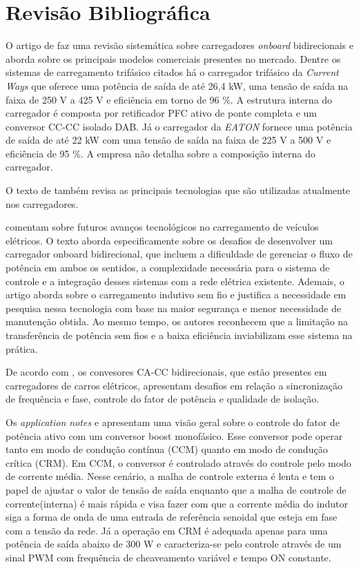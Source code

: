 \chapter{Revisão Bibliográfica}

O artigo de \cite{Yuan:2021} faz uma revisão sistemática sobre carregadores \textit{onboard}
bidirecionais e aborda sobre os principais modelos comerciais presentes no mercado. Dentre os
sistemas de carregamento trifásico citados há o carregador trifásico da \textit{Current Ways}
que oferece uma potência de saída de até 26,4 kW, uma tensão de saída na faixa de 250 V a 425 V
e eficiência em torno de 96 \%. A estrutura interna do carregador é composta por retificador
PFC ativo de ponte completa e um conversor CC-CC isolado DAB. Já o carregador da \textit{EATON}
fornece uma potência de saída de até 22 kW com uma tensão de saída na faixa de 225 V a 500 V e
eficiência de 95 \%. A empresa não detalha sobre a composição interna do carregador.

O texto de \cite{Yuan:2021} também revisa as principais tecnologias que são utilizadas
atualmente nos carregadores.

\cite{Baharom:2024} comentam sobre futuros avanços tecnológicos no carregamento de veículos elétricos. O texto aborda especificamente sobre os desafios de desenvolver um carregador onboard bidirecional, que incluem a dificuldade de gerenciar o fluxo de potência em ambos os sentidos, a complexidade necessária para o sistema de controle e a integração desses sistemas com a rede elétrica existente. Ademais, o artigo aborda sobre o carregamento indutivo sem fio e justifica a necessidade em pesquisa nessa tecnologia com base na maior segurança e menor necessidade de manutenção obtida. Ao mesmo tempo, os autores reconhecem que a limitação na transferência de potência sem fios e a baixa eficiência inviabilizam esse sistema na prática.

De acordo com \cite{Kumar:2021}, os convesores CA-CC bidirecionais, que estão presentes em
carregadores de carros elétricos, apresentam desafios em relação a sincronização de frequência
e fase, controle do fator de potência e qualidade de isolação.


Os \textit{application notes} \cite{onsemi_hbd853} e \cite{ti_zhcp224} apresentam uma visão
geral sobre o controle do fator de potência ativo com um conversor boost monofásico. Esse
conversor pode operar tanto em modo de condução contínua (CCM) quanto em modo de condução
crítica (CRM). Em CCM, o conversor é controlado através do controle pelo modo de corrente
média. Nesse cenário, a malha de controle externa é lenta e tem o papel de ajustar o valor de
tensão de saída enquanto que a malha de controle de corrente(interna) é mais rápida e visa
fazer com que a corrente média do indutor siga a forma de onda de uma entrada de referência
senoidal que esteja em fase com a tensão da rede. Já a operação em CRM é adequada apenas para
uma potência de saída abaixo de 300 W e caracteriza-se pelo controle através de um sinal PWM
com frequência de cheaveamento variável e tempo ON constante.

